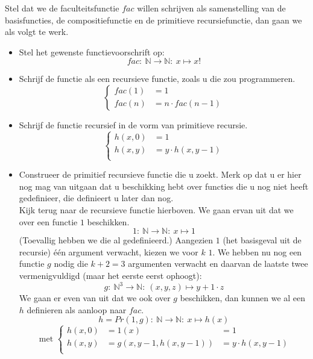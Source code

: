 \documentclass[main.tex]{subfiles}
\begin{document}
\begin{vb}
  Stel dat we de faculteitsfunctie $fac$ willen schrijven als samenstelling van de basisfuncties, de compositiefunctie en de primitieve recursiefunctie, dan gaan we als volgt te werk.
  \begin{itemize}
  \item Stel het gewenste functievoorschrift op:
    \[ fac:\ \mathbb{N} \rightarrow \mathbb{N}:\ x \mapsto x! \]
  \item Schrijf de functie als een recursieve functie, zoals u die zou programmeren.
    \[
    \left\{
      \begin{array}{rll}
        fac(1) &= 1\\
        fac(n) &= n \cdot fac(n-1)
      \end{array}
    \right.
    \]
  \item Schrijf de functie recursief in de vorm van primitieve recursie.
    \[
    \left\{
      \begin{array}{rll}
        h(x,0) &= 1\\
        h(x,y) &= y \cdot h(x,y-1)\\
      \end{array}
    \right.
    \]
  \item Construeer de primitief recursieve functie die u zoekt.
    Merk op dat u er hier nog mag van uitgaan dat u beschikking hebt over functies die u nog niet heeft gedefinieer, die definieert u later dan nog.\\
    Kijk terug naar de recursieve functie hierboven.
    We gaan ervan uit dat we over een functie $1$ beschikken.
    \[ 1:\ \mathbb{N} \rightarrow \mathbb{N}:\ x \mapsto 1 \]
    (Toevallig hebben we die al gedefinieerd.)
    Aangezien $1$ (het basisgeval uit de recursie) \'e\'en argument verwacht, kiezen we voor $k$ $1$.
    We hebben nu nog een functie $g$ nodig die $k+2=3$ argumenten verwacht en daarvan de laatste twee vermenigvuldigd (maar het eerste eerst ophoogt): 
    \[ g:\ \mathbb{N}^{3} \rightarrow \mathbb{N}:\ (x,y,z) \mapsto y+1 \cdot z \]
    We gaan er even van uit dat we ook over $g$ beschikken, dan kunnen we al een $h$ definieren als aanloop naar $fac$.
    \[ h = Pr(1,g):\ \mathbb{N} \rightarrow \mathbb{N}:\ x \mapsto h(x) \]
    \[
    \text{ met } 
    \left\{
      \begin{array}{rll}
        h(x,0) &= 1(x) &= 1\\
        h(x,y) &= g(x,y-1,h(x,y-1)) &= y \cdot h(x,y-1)\\
      \end{array}
\]
\end{itemize}
\end{vb}
\end{document}
